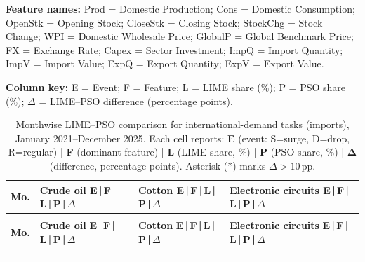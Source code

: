 \documentclass[pdftex,sn-mathphys-num]{sn-jnl}
\renewcommand{\arraystretch}{0.92}
\begin{document}
\FloatBarrier
\vspace{4pt}

{\scriptsize\noindent\textbf{Feature names:} Prod = Domestic Production; Cons = Domestic Consumption; OpenStk = Opening Stock; CloseStk = Closing Stock; StockChg = Stock Change; WPI = Domestic Wholesale Price; GlobalP = Global Benchmark Price; FX = Exchange Rate; Capex = Sector Investment; ImpQ = Import Quantity; ImpV = Import Value; ExpQ = Export Quantity; ExpV = Export Value.}\par\vspace{1pt}
{\tiny\noindent\textbf{Column key:} E = Event; F = Feature; L = LIME share (\%); P = PSO share (\%); $\Delta$ = LIME--PSO difference (percentage points).}\par\vspace{1pt}
\begingroup
\setlength{\tabcolsep}{3pt}
\renewcommand{\arraystretch}{1.08}
\scriptsize
\begin{longtable}{%
  >{\raggedright}p{1.10cm}%
  >{\raggedright}p{4.05cm}%
  >{\raggedright}p{4.05cm}%
  >{\raggedright}p{4.05cm}%
}
\caption{Monthwise LIME--PSO comparison for international-demand tasks (imports), January 2021--December 2025.
Each cell reports: \textbf{E} (event: S=surge, D=drop, R=regular) | \textbf{F} (dominant feature) | \textbf{L} (LIME share, \%) | \textbf{P} (PSO share, \%) | $\boldsymbol{\Delta}$ (difference, percentage points). Asterisk (*) marks $\Delta>10$\,pp.}
\label{tab:limepso_demand}\\
\toprule
\textbf{Mo.} &
\parbox[c]{4.00cm}{\centering\small\textbf{Crude oil}\\[1pt]\textbf{E\,|\,F\,|\,L\,|\,P\,|\,$\Delta$}} &
\parbox[c]{4.00cm}{\centering\small\textbf{Cotton}\\[1pt]\textbf{E\,|\,F\,|\,L\,|\,P\,|\,$\Delta$}} &
\parbox[c]{4.00cm}{\centering\small\textbf{Electronic circuits}\\[1pt]\textbf{E\,|\,F\,|\,L\,|\,P\,|\,$\Delta$}}\\
\midrule
\endfirsthead
{}\\[2pt]
\toprule
\textbf{Mo.} &
\parbox[c]{4.00cm}{\centering\small\textbf{Crude oil}\\[1pt]\textbf{E\,|\,F\,|\,L\,|\,P\,|\,$\Delta$}} &
\parbox[c]{4.00cm}{\centering\small\textbf{Cotton}\\[1pt]\textbf{E\,|\,F\,|\,L\,|\,P\,|\,$\Delta$}} &
\parbox[c]{4.00cm}{\centering\small\textbf{Electronic circuits}\\[1pt]\textbf{E\,|\,F\,|\,L\,|\,P\,|\,$\Delta$}}\\
\midrule
\endhead
\midrule
{}\\
\endfoot
\bottomrule
\endlastfoot
\enlargethispage{2\baselineskip}%

\end{longtable}
\endgroup
\end{document}
